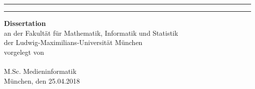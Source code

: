 \documentclass[12pt,a4paper,twoside]{book}
\begin{document}
{\begin{minipage}{188mm}
		
		\begin{center}
			\vspace*{20mm}
			\rule{\textwidth}{0.5pt}
			\vskip 5mm
			\fontsize{28}{34}\rmfamily\scshape\mytitle
			\par
			\rule{\textwidth}{0.5pt}
			\vskip 20mm
			\huge \textbf{Dissertation}\\ 
			\vspace*{5mm}
			\normalfont\Large an der Fakultät für Mathematik, Informatik und Statistik\\
			der Ludwig-Maximilians-Universität München\\
			\vspace*{10mm}
			vorgelegt von\\
			\vspace*{10mm}
			{\huge\scshape\textbf{\myname}}\\
			\vspace*{2mm}
			M.Sc. Medieninformatik\\ 
			\vspace*{20mm}
			\normalfont\Large München, den 25.04.2018 
		\end{center}
	\end{minipage}
	
	\clearpage
	
}

\pagestyle{fancy}%
\restoregeometry
\end{document}
